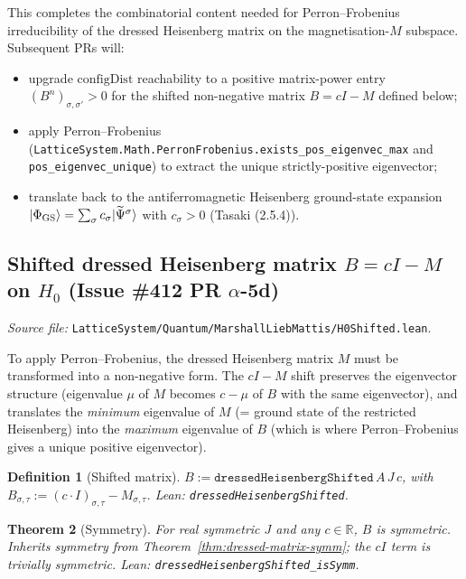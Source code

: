 \documentclass[a4paper,11pt]{article}
\newtheorem{theorem}{Theorem}
\newtheorem{definition}[theorem]{Definition}
\begin{document}
This completes the combinatorial content needed for
Perron--Frobenius irreducibility of the dressed Heisenberg matrix
on the magnetisation-$M$ subspace. Subsequent PRs will:
\begin{itemize}
\item upgrade $\mathrm{configDist}$ reachability to a positive
matrix-power entry $(B^n)_{\sigma, \sigma'} > 0$ for the shifted
non-negative matrix $B = cI - M$ defined below;
\item apply Perron--Frobenius
(\texttt{LatticeSystem.Math.PerronFrobenius.exists\_pos\_eigenvec\_max}
and \texttt{pos\_eigenvec\_unique}) to extract the unique
strictly-positive eigenvector;
\item translate back to the antiferromagnetic Heisenberg
ground-state expansion
$|\Phi_{\rm GS}\rangle = \sum_\sigma c_\sigma |\widetilde{\Psi}^\sigma\rangle$
with $c_\sigma > 0$ (Tasaki (2.5.4)).
\end{itemize}

\subsection{Shifted dressed Heisenberg matrix $B = cI - M$ on
$H_0$ (Issue \#412 PR $\alpha$-5d)}
\label{ssec:mlm-h0-shifted}

\emph{Source file:}
\texttt{LatticeSystem/Quantum/MarshallLiebMattis/H0Shifted.lean}.

To apply Perron--Frobenius, the dressed Heisenberg matrix $M$ must
be transformed into a non-negative form. The $cI - M$ shift
preserves the eigenvector structure (eigenvalue $\mu$ of $M$ becomes
$c - \mu$ of $B$ with the same eigenvector), and translates the
\emph{minimum} eigenvalue of $M$ (= ground state of the restricted
Heisenberg) into the \emph{maximum} eigenvalue of $B$ (which is
where Perron--Frobenius gives a unique positive eigenvector).

\begin{definition}[Shifted matrix]
\label{def:shifted-matrix}
$B := \texttt{dressedHeisenbergShifted}\,A\,J\,c$, with
$B_{\sigma, \tau} := (c \cdot I)_{\sigma, \tau} - M_{\sigma, \tau}$.
Lean: \texttt{dressedHeisenbergShifted}.
\end{definition}

\begin{theorem}[Symmetry]
\label{thm:shifted-symm}
For real symmetric $J$ and any $c \in \mathbb{R}$, $B$ is symmetric.
Inherits symmetry from
Theorem~\ref{thm:dressed-matrix-symm}; the $cI$ term is trivially
symmetric. Lean: \texttt{dressedHeisenbergShifted\_isSymm}.
\end{theorem}
\end{document}
